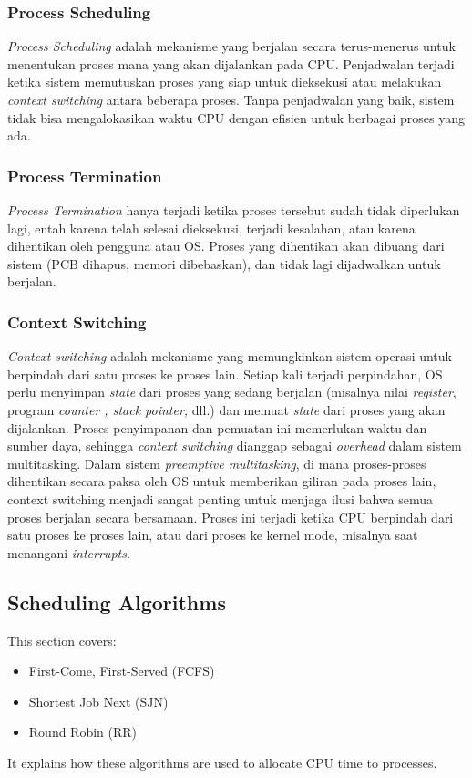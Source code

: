 \documentclass[12pt]{article}
\begin{document}
\subsubsection{Process Scheduling}
\textit{Process Scheduling} adalah mekanisme yang berjalan secara terus-menerus untuk menentukan proses mana yang akan dijalankan pada CPU. Penjadwalan terjadi ketika sistem memutuskan proses yang siap untuk dieksekusi atau melakukan \textit{context switching} antara beberapa proses. Tanpa penjadwalan yang baik, sistem tidak bisa mengalokasikan waktu CPU dengan efisien untuk berbagai proses yang ada.

\subsubsection{Process Termination}
\textit{Process Termination} hanya terjadi ketika proses tersebut sudah tidak diperlukan lagi, entah karena telah selesai dieksekusi, terjadi kesalahan, atau karena dihentikan oleh pengguna atau OS. Proses yang dihentikan akan dibuang dari sistem (PCB dihapus, memori dibebaskan), dan tidak lagi dijadwalkan untuk berjalan.

\subsubsection{Context Switching}
\textit{Context switching} adalah mekanisme yang memungkinkan sistem operasi untuk berpindah dari satu proses ke proses lain. Setiap kali terjadi perpindahan, OS perlu menyimpan \textit{state} dari proses yang sedang berjalan (misalnya nilai \textit{register}, program \textit{counter , stack pointer,} dll.) dan memuat \textit{state} dari proses yang akan dijalankan. Proses penyimpanan dan pemuatan ini memerlukan waktu dan sumber daya, sehingga \textit{context switching} dianggap sebagai \textit{overhead} dalam sistem multitasking. Dalam sistem \textit{preemptive multitasking}, di mana proses-proses dihentikan secara paksa oleh OS untuk memberikan giliran pada proses lain, \textit{}context switching menjadi sangat penting untuk menjaga ilusi bahwa semua proses berjalan secara bersamaan. Proses ini terjadi ketika CPU berpindah dari satu proses ke proses lain, atau dari proses ke kernel mode, misalnya saat menangani \textit{interrupts}.



\subsection{Scheduling Algorithms}
This section covers:
\begin{itemize}
    \item First-Come, First-Served (FCFS)
    \item Shortest Job Next (SJN)
    \item Round Robin (RR)
\end{itemize}
It explains how these algorithms are used to allocate CPU time to processes.
\end{document}
